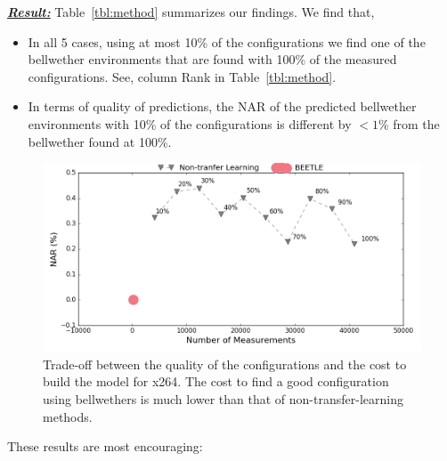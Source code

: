 \documentclass[10pt,journal,compsoc]{IEEEtran}
\newcommand{\be}{\begin{enumerate}}
\newcommand{\ee}{\end{enumerate}}
\begin{document}

\noindent\textbf{\textit{\underline{Result:}}}
Table~\ref{tbl:method} summarizes our findings. We find that, 
\begin{itemize}[leftmargin=*]
    \item In all 5 cases, using at most 10\% of the configurations we find one of the bellwether environments that are found with 100\% of the measured configurations. See, column Rank in Table~\ref{tbl:method}. 
    \item In terms of quality of predictions, the NAR of the predicted bellwether environments with 10\% of the configurations is different by $<1\%$ from the bellwether found at 100\%.
\end{itemize}

 \begin{figure}[!t]
    \centering
    \includegraphics[width=1.04\linewidth]{figures/x264.png}
    \caption{{\small Trade-off between the quality of the configurations and the cost to build the model for {\sc x264}. The cost to find a good configuration using bellwethers is much lower than that of non-transfer-learning methods. }}
    \label{fig:tradeoffx264}
\end{figure}
These  results are most encouraging:
\end{document}
